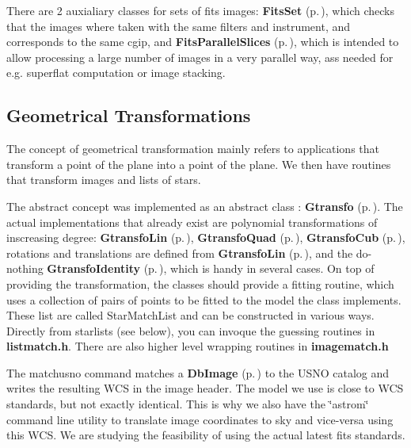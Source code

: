 There are 2 auxialiary classes for sets of fits images: {\bf Fits\-Set} {\rm (p.\,\pageref{class_fitsset})}, which checks that the images where taken with the same filters and instrument, and corresponds to the same cgip, and {\bf Fits\-Parallel\-Slices} {\rm (p.\,\pageref{class_fitsparallelslices})}, which is intended to  allow processing a large number of images in a very parallel way, ass needed for e.g. superflat computation or image stacking.

\subsection{Geometrical Transformations}\label{geomtransfo}


The concept of geometrical transformation mainly refers to applications that transform a point of the plane into a point of the plane. We then have routines that transform images and  lists of stars.

The abstract concept was implemented as an abstract class : {\bf Gtransfo} {\rm (p.\,\pageref{class_gtransfo})}. The actual implementations that already exist are polynomial transformations of inscreasing degree: {\bf Gtransfo\-Lin} {\rm (p.\,\pageref{class_gtransfolin})}, {\bf Gtransfo\-Quad} {\rm (p.\,\pageref{class_gtransfoquad})}, {\bf Gtransfo\-Cub} {\rm (p.\,\pageref{class_gtransfocub})}, rotations and translations are defined from {\bf Gtransfo\-Lin} {\rm (p.\,\pageref{class_gtransfolin})}, and  the do-nothing {\bf Gtransfo\-Identity} {\rm (p.\,\pageref{class_gtransfoidentity})}, which is handy in several cases. On top of providing the transformation, the classes should provide a fitting routine, which uses a collection of pairs of points to be fitted to the model the class implements. These list are called Star\-Match\-List and can be constructed in various ways. Directly from starlists (see below), you can invoque the guessing routines in {\bf listmatch.h}. There are also higher level wrapping routines  in {\bf imagematch.h}

The matchusno command matches a {\bf Db\-Image} {\rm (p.\,\pageref{class_dbimage})} to the USNO catalog and writes the resulting WCS in the image header. The model we use is close to WCS standards, but not exactly identical. This is why we also have the \char`\"{}astrom\char`\"{} command line utility to translate image coordinates to sky and  vice-versa using this WCS. We are studying the feasibility of using the actual latest fits standards.

